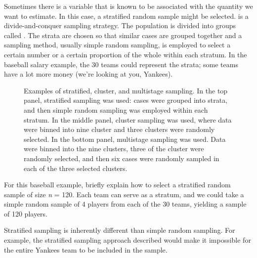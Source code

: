 \D{\newpage}

Sometimes there is a variable that is known to be associated with the quantity we want to estimate. In this case, a stratified random sample might be selected.  is a divide-and-conquer sampling strategy. The population is divided into groups called . The strata are chosen so that similar cases are grouped together and a sampling method, usually simple random sampling, is employed to select a certain number or a certain proportion of the whole within each stratum. In the baseball salary example, the 30 teams could represent the strata; some teams have a lot more money (we're looking at you, Yankees).

\begin{figure}
\centering
{}
\caption{Examples of stratified, cluster, and multistage sampling. In the top panel, stratified sampling was used: cases were grouped into strata, and then simple random sampling was employed within each stratum. In the middle panel, cluster sampling was used, where data were binned into nine cluster and three clusters were randomly selected. In the bottom panel, multistage sampling was used. Data were binned into the nine clusters, three of the cluster were randomly selected, and then six cases were randomly sampled in each of the three selected clusters.}
\label{stratified_cluster_multistage}
\end{figure}

\begin{examplewrap}
\begin{nexample}{For this baseball example, briefly explain how to select a stratified random sample of size \textit{n} = 120. }
Each team can serve as a stratum, and we could take a simple random sample of 4 players from each of the 30 teams, yielding a sample of 120 players.
\end{nexample}
\end{examplewrap}

Stratified sampling is inherently different than simple random sampling. For example, the stratified sampling approach described would make it impossible for the entire Yankees team to be included in the sample.

